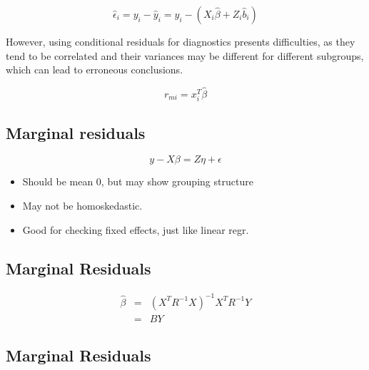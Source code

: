\documentclass[Main.tex]{subfiles}
\begin{document}
\[ \hat{\epsilon}_{i} = y_{i} - \hat{y}_{i} = y_{i} - ( X_{i}\hat{\beta} + Z_{i}\hat{b}_{i}) \]

However, using conditional residuals for diagnostics presents difficulties, as they tend to be correlated and their variances may be different for different subgroups, which can lead to erroneous conclusions.



\begin{equation}
r_{mi}=x^{T}_{i}\hat{\beta}
\end{equation}

\subsection*{Marginal residuals}

\[y - X\beta = Z \eta +\epsilon \]
\begin{itemize}
	\item
	Should be mean 0, but may show grouping structure
	\item
	May not be homoskedastic.
	\item
	Good for checking fixed effects, just like linear regr.
\end{itemize}
\subsection{Marginal Residuals}
\begin{eqnarray}
\hat{\beta} &=& (X^{T}R^{-1}X)^{-1}X^{T}R^{-1}Y \nonumber \\
&=& BY \nonumber
\end{eqnarray}


\subsection*{Marginal Residuals}

\end{document}
